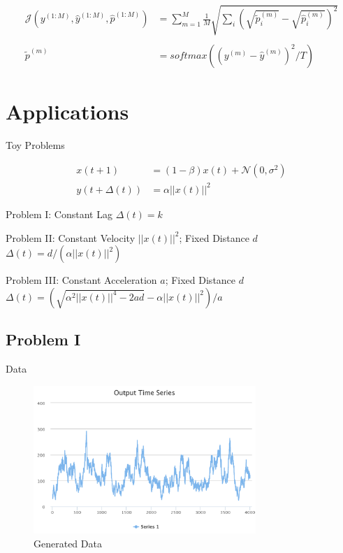 \documentclass{beamer}
\begin{document}
\begin{frame}
\begin{align*}
\mathcal{J}(y^{(1:M)}, \hat{y}^{(1:M)}, \hat{p}^{(1:M)}) &= \sum_{m = 1}^{M}{\frac{1}{M} \sqrt{\sum_{i}{(\sqrt{\widetilde{p}^{(m)}_i} -  \sqrt{\hat{p}^{(m)}_i})^2}}} \\\\
\widetilde{p}^{(m)} &= softmax( (y^{(m)} - \hat{y}^{(m)})^{2}/T )
\end{align*}
\end{frame}


\section{Applications}

\begin{frame}{Toy Problems}

\begin{align*}
 x(t+1) &= (1 - \beta) x(t) + \mathcal{N}(0, \sigma^2) \\
 y(t+\Delta(t)) &= \alpha ||x(t)||^2
\end{align*}

\begin{block}{Problem I: Constant Lag}
$\Delta(t) = k$
\end{block}

\begin{block}{Problem II: Constant Velocity $||x(t)||^2$; Fixed Distance $d$}
$\Delta(t) = d/(\alpha ||x(t)||^2)$
\end{block}

\begin{block}{Problem III: Constant Acceleration $a$; Fixed Distance $d$}
$\Delta(t) = (\sqrt{\alpha^2||x(t)||^4 - 2ad} - \alpha||x(t)||^2)/a$
\end{block}

\end{frame}

\subsection{Problem I}
\begin{frame}{Data}
    \begin{figure}[h]
        \includegraphics[width=0.75\textwidth]{timeseries-problem-i.png}
        \caption{Generated Data}
        \label{fig:TimeSeries-i}
      \end{figure}
\end{frame}
\end{document}
